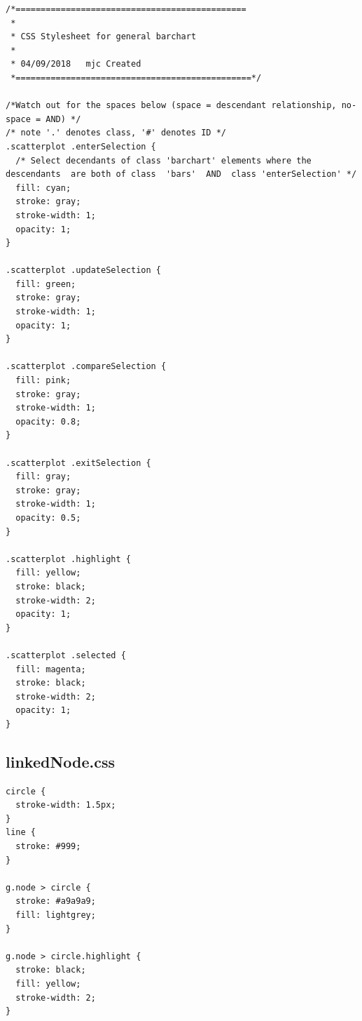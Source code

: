 \documentclass[a4paper, 11pt]{article}
\begin{document}
\begin{verbatim}
/*==============================================
 *
 * CSS Stylesheet for general barchart
 *
 * 04/09/2018	mjc	Created
 *===============================================*/

/*Watch out for the spaces below (space = descendant relationship, no-space = AND) */
/* note '.' denotes class, '#' denotes ID */
.scatterplot .enterSelection {
  /* Select decendants of class 'barchart' elements where the descendants  are both of class  'bars'  AND  class 'enterSelection' */
  fill: cyan;
  stroke: gray;
  stroke-width: 1;
  opacity: 1;
}

.scatterplot .updateSelection {
  fill: green;
  stroke: gray;
  stroke-width: 1;
  opacity: 1;
}

.scatterplot .compareSelection {
  fill: pink;
  stroke: gray;
  stroke-width: 1;
  opacity: 0.8;
}

.scatterplot .exitSelection {
  fill: gray;
  stroke: gray;
  stroke-width: 1;
  opacity: 0.5;
}

.scatterplot .highlight {
  fill: yellow;
  stroke: black;
  stroke-width: 2;
  opacity: 1;
}

.scatterplot .selected {
  fill: magenta;
  stroke: black;
  stroke-width: 2;
  opacity: 1;
}

\end{verbatim}


\newpage
\subsection{linkedNode.css}

\begin{verbatim}
circle {
  stroke-width: 1.5px;
}
line {
  stroke: #999;
}

g.node > circle {
  stroke: #a9a9a9;
  fill: lightgrey;
}

g.node > circle.highlight {
  stroke: black;
  fill: yellow;
  stroke-width: 2;
}

\end{verbatim}



\end{document}
